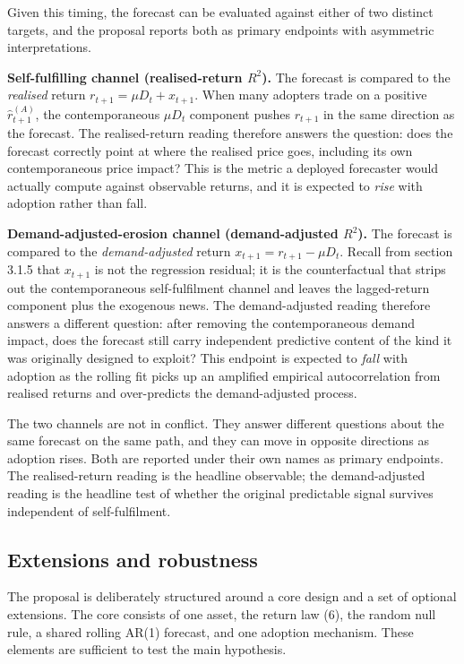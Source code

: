\documentclass[11pt]{article}
\begin{document}
Given this timing, the forecast can be evaluated against either of two distinct targets, and the proposal reports both as primary endpoints with asymmetric interpretations.

\textbf{Self-fulfilling channel (realised-return $R^{2}$).} The forecast is compared to the \emph{realised} return $r_{t+1} = \mu D_t + x_{t+1}$. When many adopters trade on a positive $\hat{r}_{t+1}^{(A)}$, the contemporaneous $\mu D_t$ component pushes $r_{t+1}$ in the same direction as the forecast. The realised-return reading therefore answers the question: does the forecast correctly point at where the realised price goes, including its own contemporaneous price impact? This is the metric a deployed forecaster would actually compute against observable returns, and it is expected to \emph{rise} with adoption rather than fall.

\textbf{Demand-adjusted-erosion channel (demand-adjusted $R^{2}$).} The forecast is compared to the \emph{demand-adjusted} return $x_{t+1} = r_{t+1} - \mu D_t$. Recall from section 3.1.5 that $x_{t+1}$ is not the regression residual; it is the counterfactual that strips out the contemporaneous self-fulfilment channel and leaves the lagged-return component plus the exogenous news. The demand-adjusted reading therefore answers a different question: after removing the contemporaneous demand impact, does the forecast still carry independent predictive content of the kind it was originally designed to exploit? This endpoint is expected to \emph{fall} with adoption as the rolling fit picks up an amplified empirical autocorrelation from realised returns and over-predicts the demand-adjusted process.

The two channels are not in conflict. They answer different questions about the same forecast on the same path, and they can move in opposite directions as adoption rises. Both are reported under their own names as primary endpoints. The realised-return reading is the headline observable; the demand-adjusted reading is the headline test of whether the original predictable signal survives independent of self-fulfilment.

\subsection{Extensions and robustness}

The proposal is deliberately structured around a core design and a set of optional extensions. The core consists of one asset, the return law (6), the random null rule, a shared rolling AR(1) forecast, and one adoption mechanism. These elements are sufficient to test the main hypothesis.
\end{document}
